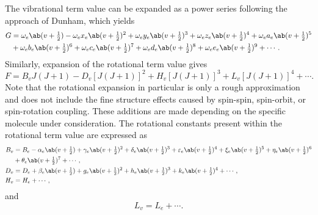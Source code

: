 The vibrational term value can be expanded as a power series following the approach of Dunham, which yields \cite[419]{babouHighTemperatureNonequilibriumPartition2009}
\begin{align*}
    G & = \omega_e\ab(v + \tfrac{1}{2}) - \omega_ex_e\ab(v + \tfrac{1}{2})^2 + \omega_ey_e\ab(v + \tfrac{1}{2})^3 + \omega_ez_e\ab(v + \tfrac{1}{2})^4 + \omega_ea_e\ab(v + \tfrac{1}{2})^5 \\
    & + \omega_eb_e\ab(v + \tfrac{1}{2})^6 + \omega_ec_e\ab(v + \tfrac{1}{2})^7 + \omega_ed_e\ab(v + \tfrac{1}{2})^8 + \omega_ee_e\ab(v + \tfrac{1}{2})^9 + \dotsb.
\end{align*}
Similarly, expansion of the rotational term value gives
\begin{equation*}
    F = B_vJ(J + 1) - D_v[J(J + 1)]^2 + H_v[J(J + 1)]^3 + L_v[J(J + 1)]^4 + \dotsb.
\end{equation*}
Note that the rotational expansion in particular is only a rough approximation and does not include the fine structure effects caused by spin-spin, spin-orbit, or spin-rotation coupling.
These additions are made depending on the specific molecule under consideration.
The rotational constants present within the rotational term value are expressed as
\begin{align*}
    B_v & = B_e - \alpha_e\ab(v + \tfrac{1}{2}) + \gamma_e\ab(v + \tfrac{1}{2})^2 + \delta_e\ab(v + \tfrac{1}{2})^3 + \varepsilon_e\ab(v + \tfrac{1}{2})^4 + \xi_e\ab(v + \tfrac{1}{2})^5 + \eta_e\ab(v + \tfrac{1}{2})^6 \\
    & + \theta_e\ab(v + \tfrac{1}{2})^7 + \dotsb,                                                                                                                                                                                         \\
    D_v & = D_e + \beta_e\ab(v + \tfrac{1}{2}) + g_e\ab(v + \tfrac{1}{2})^2 + h_e\ab(v + \tfrac{1}{2})^3 + k_e\ab(v + \tfrac{1}{2})^4 + \dotsb,                                                                                   \\
    H_v & = H_e + \dotsb,
\end{align*}
and
\begin{equation*}
    L_v = L_e + \dotsb.
\end{equation*}


